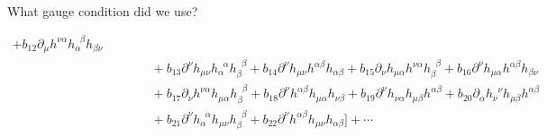 \documentclass[aspectratio=169,usenames,dvipsnames]{beamer}
\begin{document}
\begin{frame}{\centering {}\\ What
    gauge condition did we use?}
\begin{itemize}
\begin{align*}
                + b_{12} \partial_{\mu} h^{ \nu \alpha} h_{\alpha}^{\;\;\beta} h_{\beta \nu}
  \\ & \qquad\quad                + b_{13} \partial^{\nu} h_{ \mu \nu} h_{\alpha}^{\;\;\alpha} h_{\beta}^{\;\;\beta}
                + b_{14} \partial^{\nu} h_{ \mu \nu} h^{\alpha \beta} h_{\alpha \beta}
                + b_{15} \partial_{\nu} h_{ \mu \alpha} h^{\nu \alpha} h_{\beta}^{\;\;\beta}
                + b_{16} \partial^{\nu} h_{ \mu \alpha} h^{\alpha \beta} h_{\beta \nu}
 \\ & \qquad\quad                + b_{17} \partial_{\nu} h^{ \nu \alpha} h_{\mu \alpha} h_{\beta}^{\;\;\beta}
                + b_{18} \partial^{\nu} h^{ \alpha \beta} h_{\mu \alpha} h_{\nu \beta}
                + b_{19} \partial^{\nu} h_{ \nu \alpha} h_{\mu \beta} h^{\alpha \beta}
                + b_{20} \partial_{\alpha} h_{ \nu}^{\;\;\nu} h_{\mu \beta} h^{\alpha \beta}
 \\ & \qquad\quad                + b_{21} \partial^{\nu} h_{ \alpha}^{\;\;\alpha} h_{\mu \nu} h_{\beta}^{\;\;\beta}
                + b_{22} \partial^{\nu} h^{ \alpha \beta} h_{\mu \nu} h_{\alpha \beta}
      \Big ] + \cdots
\end{align*}
\end{itemize}
\vspace{50mm}
\end{frame}
\end{document}
